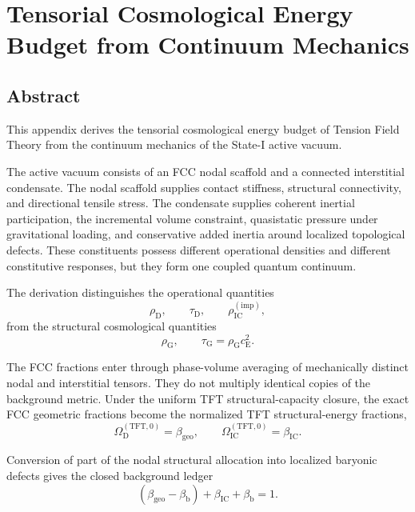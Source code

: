 \chapter{Tensorial Cosmological Energy Budget from Continuum Mechanics}
\label{app:cosmic_energy_continuum_mechanics}

\section*{Abstract}
This appendix derives the tensorial cosmological energy budget of Tension Field Theory from the continuum mechanics of the State-I active vacuum.

The active vacuum consists of an FCC nodal scaffold and a connected interstitial condensate. The nodal scaffold supplies contact stiffness, structural connectivity, and directional tensile stress. The condensate supplies coherent inertial participation, the incremental volume constraint, quasistatic pressure under gravitational loading, and conservative added inertia around localized topological defects. These constituents possess different operational densities and different constitutive responses, but they form one coupled quantum continuum.

The derivation distinguishes the operational quantities
\begin{equation}
    \rho_{\mathrm{D}}, \qquad \tau_{\mathrm{D}}, \qquad \rho_{\mathrm{IC}}^{(\mathrm{imp})},
\end{equation}
from the structural cosmological quantities
\begin{equation}
    \rho_{\mathrm{G}}, \qquad \tau_{\mathrm{G}} = \rho_{\mathrm{G}}c_{\mathrm{E}}^2.
\end{equation}

The FCC fractions enter through phase-volume averaging of mechanically distinct nodal and interstitial tensors. They do not multiply identical copies of the background metric. Under the uniform TFT structural-capacity closure, the exact FCC geometric fractions become the normalized TFT structural-energy fractions,
\begin{equation}
    \Omega_{\mathrm{D}}^{(\mathrm{TFT},0)} = \beta_{\mathrm{geo}}, \qquad \Omega_{\mathrm{IC}}^{(\mathrm{TFT},0)} = \beta_{\mathrm{IC}}.
\end{equation}

Conversion of part of the nodal structural allocation into localized baryonic defects gives the closed background ledger
\begin{equation}
    \left( \beta_{\mathrm{geo}}-\beta_{\mathrm{b}} \right) + \beta_{\mathrm{IC}} + \beta_{\mathrm{b}} = 1.
\end{equation}

